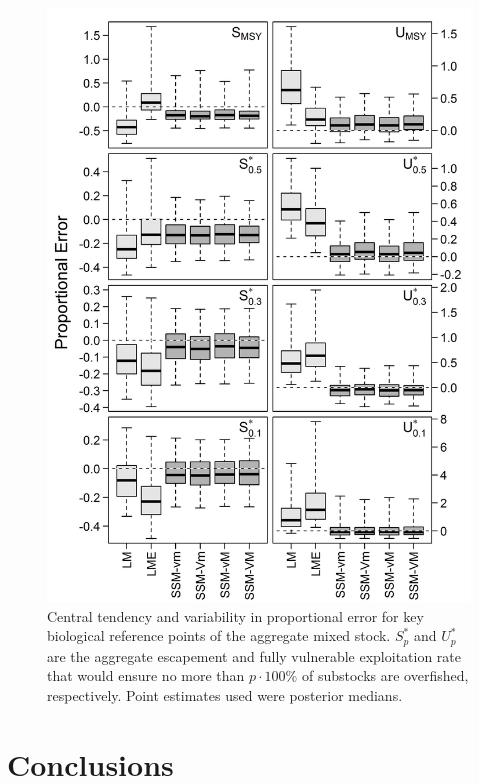 \documentclass[12pt,]{book}
\theoremstyle{definition}
\theoremstyle{definition}
\theoremstyle{definition}
\theoremstyle{remark}
\begin{document}
\begin{figure}
  \centering
  \includegraphics{img/Ch4/ref-point-bias.jpg}
  \caption{Central tendency and variability in proportional error for key biological reference points of the aggregate mixed stock. $S^*_p$ and $U^*_p$ are the aggregate escapement and fully vulnerable exploitation rate that would ensure no more than $p \cdot 100\%$ of substocks are overfished, respectively. Point estimates used were posterior medians.}
  \label{fig:ref-point-bias}
\end{figure}

\doublespacing

\chapter{Conclusions}\label{ch5}
\end{document}
